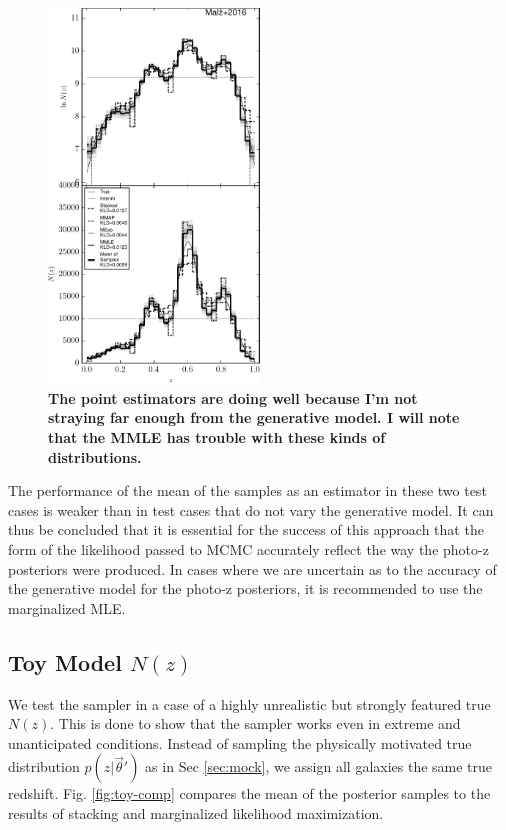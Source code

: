\documentclass[preprint]{aastex}
\begin{document}
\begin{figure}
\includegraphics[width=0.5\textwidth]{figs/mult/comps.pdf}
\caption{\textbf{The point estimators are doing well because I'm not straying 
far enough from the generative model.  I will note that the MMLE has trouble 
with these kinds of distributions.}}
\label{fig:multi-comp}
\end{figure}

The performance of the mean of the samples as an estimator in these two test 
cases is weaker than in test cases that do not vary the generative model.  It 
can thus be concluded that it is essential for the success of this approach 
that the form of the likelihood passed to MCMC accurately reflect the way the 
photo-z posteriors were produced.  In cases where we are uncertain as to the 
accuracy of the generative model for the photo-z posteriors, it is recommended 
to use the marginalized MLE.

\clearpage
\subsection{Toy Model $N(z)$}
\label{sec:fake}

We test the sampler in a case of a highly unrealistic but strongly featured 
true $N(z)$.  This is done to show that the sampler works even in extreme and 
unanticipated conditions.  Instead of sampling the physically motivated true 
distribution $p(z|\vec{\theta}')$ as in Sec \ref{sec:mock}, we assign all 
galaxies the same true redshift.  Fig. \ref{fig:toy-comp} compares the mean of 
the posterior samples to the results of stacking and marginalized likelihood 
maximization.    
\end{document}
